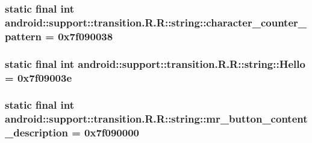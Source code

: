 \hypertarget{classandroid_1_1support_1_1transition_1_1_r_1_1string_3d01c0d5a23358187bf35675c76fdc29}{
\subsubsection[{character\_\-counter\_\-pattern}]{\setlength{\rightskip}{0pt plus 5cm}static final int android::support::transition.R.R::string::character\_\-counter\_\-pattern = 0x7f090038}}
\label{classandroid_1_1support_1_1transition_1_1_r_1_1string_3d01c0d5a23358187bf35675c76fdc29}


\hypertarget{classandroid_1_1support_1_1transition_1_1_r_1_1string_0025a321b8200e162b029eb623d2fe97}{
\subsubsection[{Hello}]{\setlength{\rightskip}{0pt plus 5cm}static final int android::support::transition.R.R::string::Hello = 0x7f09003e}}
\label{classandroid_1_1support_1_1transition_1_1_r_1_1string_0025a321b8200e162b029eb623d2fe97}


\hypertarget{classandroid_1_1support_1_1transition_1_1_r_1_1string_e395e3d8d7e7f357ecf1e3ed4e414f74}{
\subsubsection[{mr\_\-button\_\-content\_\-description}]{\setlength{\rightskip}{0pt plus 5cm}static final int android::support::transition.R.R::string::mr\_\-button\_\-content\_\-description = 0x7f090000}}
\label{classandroid_1_1support_1_1transition_1_1_r_1_1string_e395e3d8d7e7f357ecf1e3ed4e414f74}


